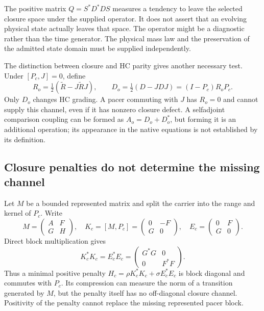 The positive matrix $Q=S^*D^*DS$ measures a tendency to leave the
selected closure space under the supplied operator. It does not
assert that an evolving physical state actually leaves that space.
The operator might be a diagnostic rather than the time generator.
The physical mass law and the preservation of the admitted state
domain must be supplied independently.

The distinction between closure and HC parity gives another necessary
test. Under $[P_c,J]=0$, define
\begin{equation}
 R_o=\tfrac12(\widetilde R-J\widetilde RJ),\qquad
 D_o=\tfrac12(D-JDJ)=(I-P_c)R_oP_c.
\end{equation}
Only $D_o$ changes HC grading. A pacer commuting with $J$ has
$R_o=0$ and cannot supply this channel, even if it has nonzero
closure defect. A selfadjoint comparison coupling can be formed as
$A_o=D_o+D_o^*$, but forming it is an additional operation; its
appearance in the native equations is not established by its definition.

\subsection{Closure penalties do not determine the missing channel}
Let $M$ be a bounded represented matrix and split the carrier into
the range and kernel of $P_c$. Write
\begin{equation}
 M=\begin{pmatrix}A&F\\G&H\end{pmatrix},\quad
 K_c=[M,P_c]=\begin{pmatrix}0&-F\\G&0\end{pmatrix},\quad
 E_c=\begin{pmatrix}0&F\\G&0\end{pmatrix}.
\end{equation}
Direct block multiplication gives
\begin{equation}
 K_c^*K_c=E_c^*E_c=
 \begin{pmatrix}G^*G&0\\0&F^*F\end{pmatrix}.
\end{equation}
Thus a minimal positive penalty
$H_c=\rho K_c^*K_c+\sigma E_c^*E_c$ is block diagonal and
commutes with $P_c$. Its compression can measure the norm of a
transition generated by $M$, but the penalty itself has no off-diagonal
closure channel. Positivity of the penalty cannot replace the missing
represented pacer block.

